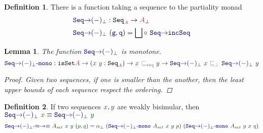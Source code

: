 \documentclass[twoside,11pt,openright]{report}
\theoremstyle{plain} %
\newtheorem{lem}[thm]{Lemma}
\theoremstyle{definition}
\newtheorem{defn}{Definition}[section]
\theoremstyle{remark}
\newcommand*{\term}[1]{\textcolor{green!30!black}{#1}} %
\newcommand*{\type}[1]{\textcolor{magenta!90!black}{#1}}
\newcommand*{\relation}[1]{\textcolor{gray}{\ensuremath{\mathtt{#1}}}}
\newcommand*{\function}[1]{\textcolor{blue!60!black}{\ensuremath{\mathtt{#1}}}}
\newcommand*{\constructor}[1]{\textcolor{purple!60!black}{\ensuremath{\mathtt{#1}}}}
\newcommand*{\typeformer}[1]{\ensuremath{\mathtt{#1}}}
\begin{document}
\begin{defn}
  There is a function taking a sequence to the partiality monad
  \begin{equation}
    \begin{aligned}
      &\function{Seq{\rightarrow}(-)_\bot} : \typeformer{Seq}_{\type{A}} \rightarrow \type{A}_{\bot} \\
      &\function{Seq{\rightarrow}(-)_\bot}~(\function{g},\function{q}) = \bigsqcup \circ~\function{Seq{\rightarrow}incSeq}
    \end{aligned}
  \end{equation}
\end{defn}
\begin{lem}
  The function \(\function{Seq{\rightarrow}(-)_\bot}\) is monotone. 
  \begin{equation}
    \function{Seq{\rightarrow}(-)_\bot\text{-}mono} : \typeformer{isSet} \type{A} \rightarrow (\term{x}~\term{y} : \typeformer{Seq}_{\type{A}}) \rightarrow \term{x}~\relation{\sqsubseteq_{seq}}~\term{y} \rightarrow \function{Seq{\rightarrow}(-)_\bot}~\term{x}~\relation{\sqsubseteq_{\bot}}~\function{Seq{\rightarrow}(-)_\bot}~\term{y}
\end{equation}
  \begin{proof}
    Given two sequences, if one is smaller than the another, then the least upper bounds of each sequence respect the ordering. 
  \end{proof}
\end{lem}
\begin{defn}
  If two sequences \(\term{x},\term{y}\) are weakly bisimular, then \(\function{Seq{\rightarrow}(-)_\bot}~\term{x} \equiv \function{Seq{\rightarrow}(-)_\bot}~\term{y}\)
\begin{equation}
  \function{Seq{\rightarrow}(-)_\bot\text{-}{\approx}{\rightarrow}{\equiv}}~\term{A_{set}}~\term{x}~\term{y}~(\term{p} , \term{q}) = \constructor{\alpha_{\bot}}~(\function{Seq{\rightarrow}(-)_\bot\text{-}mono}~\term{A_{set}}~\term{x}~\term{y}~\term{p})~(\function{Seq{\rightarrow}(-)_\bot\text{-}mono}~\term{A_{set}}~\term{y}~\term{x}~\term{q})
\end{equation}
\end{defn}
\end{document}
